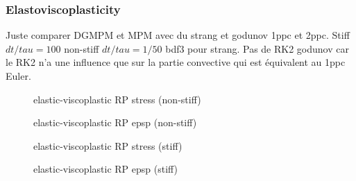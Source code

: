 


\subsubsection{Elastoviscoplasticity}

Juste comparer DGMPM et MPM avec du strang et godunov 1ppc et 2ppc. Stiff $dt/tau=100$ non-stiff $dt/tau=1/50$ bdf3 pour strang. Pas de RK2 godunov car le RK2 n'a une influence que sur la partie convective qui est équivalent au 1ppc Euler.

\begin{figure}[h!]
  \centering
  {}
  {}
  {}
  \caption{elastic-viscoplastic RP stress (non-stiff)}
  \label{fig:stress_elastoviscoplastic_RP}
\end{figure}

\begin{figure}[h!]
  \centering
  {}
  {}
  {}
  \caption{elastic-viscoplastic RP epsp (non-stiff)}
  \label{fig:epsp_elastoviscoplastic_RP}
\end{figure}

\begin{figure}[h!]
  \centering
  {}
  {}
  {}
  \caption{elastic-viscoplastic RP stress (stiff)}
  \label{fig:stress_elastoviscoplastic_RP}
\end{figure}

\begin{figure}[h!]
  \centering
  {}
  {}
  {}
  \caption{elastic-viscoplastic RP epsp (stiff)}
  \label{fig:epsp_elastoviscoplastic_RP}
\end{figure}

